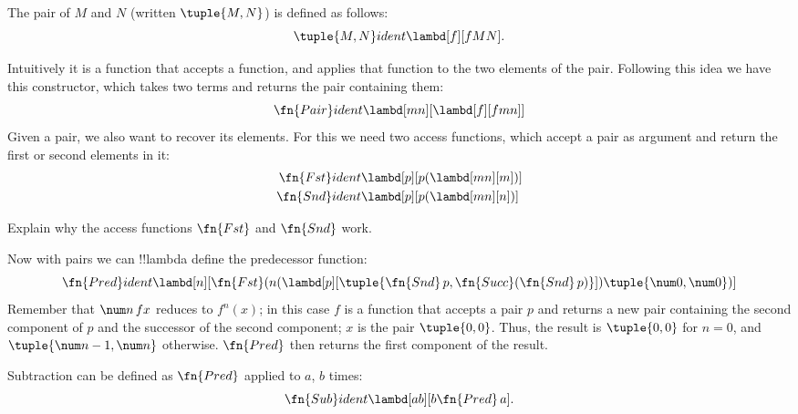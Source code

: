 \documentclass[../../../include/open-logic-section]{subfiles}
\begin{document}

\begin{defn}
The pair of $M$ and $N$ (written $\tuple{M,N}$) is defined as follows:
\[
\tuple{M,N} ident \lambd[f][fMN].
\]
\end{defn}
  
Intuitively it is a function that accepts a function, and applies that
function to the two elements of the pair. Following this idea we have
this constructor, which takes two terms and returns the pair containing
them:
\[
  \fn{Pair} ident \lambd[mn][\lambd[f][fmn]]
\]
Given a pair, we also want to recover its elements.
For this we need two access functions, which accept a pair as argument and
return the first or second elements in it:
\begin{align*}
  \fn{Fst} &ident \lambd[p][p(\lambd[mn][m])]\\
  \fn{Snd} &ident \lambd[p][p(\lambd[mn][n])]
\end{align*}

\begin{prob}
  Explain why the access functions $\fn{Fst}$ and $\fn{Snd}$ work.
\end{prob}

Now with pairs we can !!{lambda define} the predecessor function:
\[
  \fn{Pred} ident \lambd[n][\fn{Fst}(n (\lambd[p][\tuple{\fn{Snd}\, {p}, \fn{Succ}(\fn{Snd}\, {p})}]) \tuple{\num 0, \num 0})]
\]
Remember that $\num n\, f x$ reduces to $f^{n}(x)$; in this
case $f$ is a function that accepts a pair $p$ and returns a new
pair containing the second component of $p$ and the successor of the
second component; $x$ is the pair $\tuple{0,0}$. Thus, the
result is $\tuple{0,0}$ for $n=0$, and $\tuple{{\num n-1}, \num n}$
otherwise. $\fn{Pred}$ then returns the first component of the result.

Subtraction can be defined as $\fn{Pred}$ applied to $a$, $b$ times:
\[
\fn{Sub} ident \lambd[ab][b \fn{Pred}\, a].
\]
    
\end{document}
